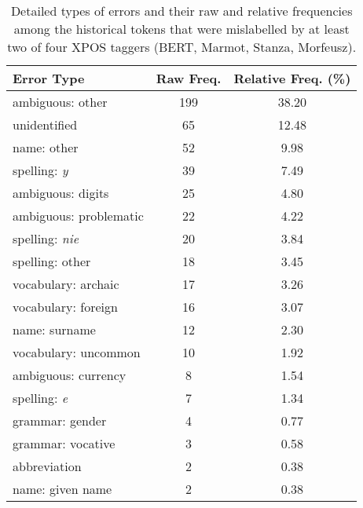 \renewcommand{\arraystretch}{1.25}
\begin{table}[H]
\begin{center}
\begin{tabular}{|l|cc|}
\hline \bf Error Type & \bf Raw Freq. & \bf Relative Freq. (\%) \\ \hline
ambiguous: other & 199 & 38.20 \\
unidentified & 65 & 12.48 \\
name: other & 52 & 9.98 \\
spelling: \textit{y} & 39 & 7.49 \\
ambiguous: digits & 25 & 4.80 \\
ambiguous: problematic & 22 & 4.22 \\
spelling: \textit{nie} & 20 & 3.84 \\
spelling: other & 18 & 3.45 \\
vocabulary: archaic & 17 & 3.26 \\
vocabulary: foreign & 16 & 3.07 \\
name: surname & 12 & 2.30 \\
vocabulary: uncommon & 10 & 1.92 \\
ambiguous: currency & 8 & 1.54 \\
spelling: \textit{e} & 7 & 1.34 \\
grammar: gender & 4 & 0.77 \\
grammar: vocative & 3 & 0.58 \\
abbreviation & 2 & 0.38 \\
name: given name & 2 & 0.38 \\
\hline
\end{tabular}
\caption{\label{table:xpos-errors} Detailed types of errors and their raw and relative frequencies among the historical tokens that were mislabelled by at least two of four XPOS taggers (BERT, Marmot, Stanza, Morfeusz).}
\end{center}
\end{table}

